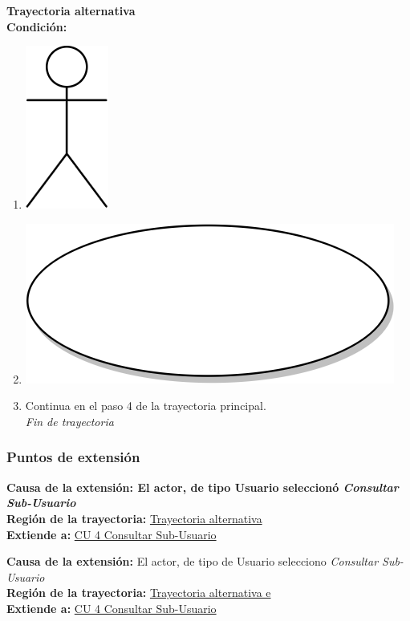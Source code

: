 \textbf{Trayectoria alternativa} \label{cu4_ta_} \\
\textbf{Condición:} \\
 \begin{enumerate}[label=\arabic*]
    \item {\includegraphics[scale=.1]{Capitulo3/img/actor.png} }
    \item {\includegraphics[scale=.05]{Capitulo3/img/proceso.png}}
    \item {Continua en el paso 4 de la trayectoria principal.} \\
    \textit{Fin de trayectoria} \\
\end{enumerate}

\subsubsection{Puntos de extensión}
\noindent \textbf{Causa de la extensión: El actor, de tipo Usuario seleccionó \textit{Consultar Sub-Usuario}} \\
\textbf{Región de la trayectoria:} \hyperref[cu4_ta_]{Trayectoria alternativa } \\
\textbf{Extiende a:} \hyperref[cu3]{CU 4 Consultar Sub-Usuario}

\noindent \textbf{Causa de la extensión:} El actor, de tipo de Usuario selecciono \textit{Consultar Sub-Usuario} \\
\textbf{Región de la trayectoria:} \hyperref[cu4_ta_e]{Trayectoria alternativa e} \\
\textbf{Extiende a:} \hyperref[cu4]{CU 4 Consultar Sub-Usuario}
